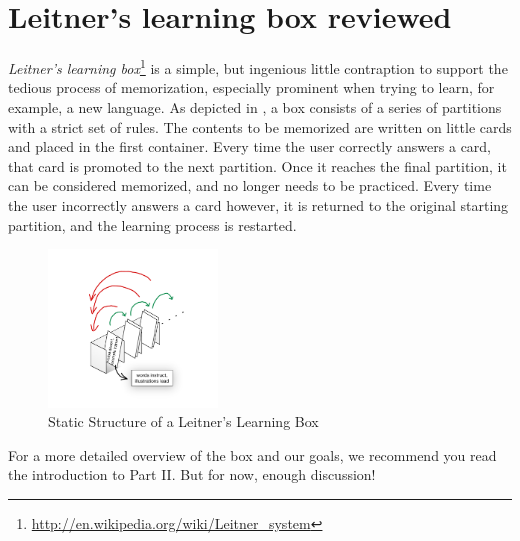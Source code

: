 \chapter{Leitner's learning box reviewed}

\emph{Leitner's learning box}\footnote{\href{http://en.wikipedia.org/wiki/Leitner\_system}{http://en.wikipedia.org/wiki/Leitner\_system}} is a simple, but
ingenious little contraption to support the tedious process of memorization, especially prominent when trying to learn, for example, a new language. As depicted
in , a box consists of a series of partitions with a strict set of rules. The contents to be memorized are written on little
cards and placed in the first container. Every time the user correctly answers a card, that card is promoted to the next partition. Once it reaches the final
partition, it can be considered memorized, and no longer needs to be practiced. Every time the user incorrectly answers a card however, it is returned to the
original starting partition, and the learning process is restarted.

\begin{figure}[htbp]
	\centering
  \includegraphics[width=0.4\textwidth]{../../org.moflon.doc.handbook.00_common/images/membox_illustration.pdf}
	\caption{Static Structure of a Leitner's Learning Box}
	\label{fig:membox_depiction}
\end{figure}

For a more detailed overview of the box and our goals, we recommend you read the introduction to Part II. But for now, enough discussion!


